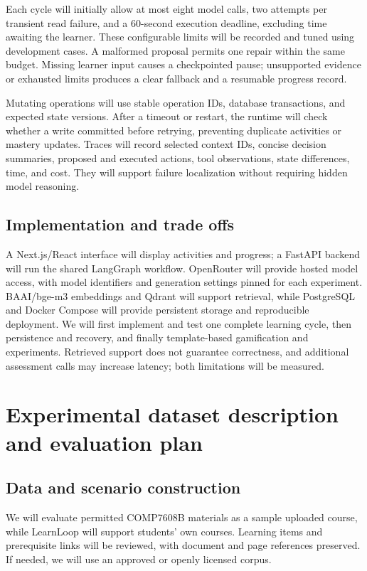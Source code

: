 \documentclass{article}
\begin{document}
Each cycle will initially allow at most eight model calls, two attempts per transient read failure, and a 60-second execution deadline, excluding time awaiting the learner. These configurable limits will be recorded and tuned using development cases. A malformed proposal permits one repair within the same budget. Missing learner input causes a checkpointed pause; unsupported evidence or exhausted limits produces a clear fallback and a resumable progress record.

Mutating operations will use stable operation IDs, database transactions, and expected state versions. After a timeout or restart, the runtime will check whether a write committed before retrying, preventing duplicate activities or mastery updates. Traces will record selected context IDs, concise decision summaries, proposed and executed actions, tool observations, state differences, time, and cost. They will support failure localization without requiring hidden model reasoning.

\subsection{Implementation and trade offs}

A Next.js/React interface will display activities and progress; a FastAPI backend will run the shared LangGraph workflow. OpenRouter will provide hosted model access, with model identifiers and generation settings pinned for each experiment. BAAI/bge-m3 embeddings and Qdrant will support retrieval, while PostgreSQL and Docker Compose will provide persistent storage and reproducible deployment. We will first implement and test one complete learning cycle, then persistence and recovery, and finally template-based gamification and experiments. Retrieved support does not guarantee correctness, and additional assessment calls may increase latency; both limitations will be measured.

\section{Experimental dataset description and evaluation plan}

\subsection{Data and scenario construction}

We will evaluate permitted COMP7608B materials as a sample uploaded course, while LearnLoop will support students' own courses. Learning items and prerequisite links will be reviewed, with document and page references preserved. If needed, we will use an approved or openly licensed corpus.
\end{document}
